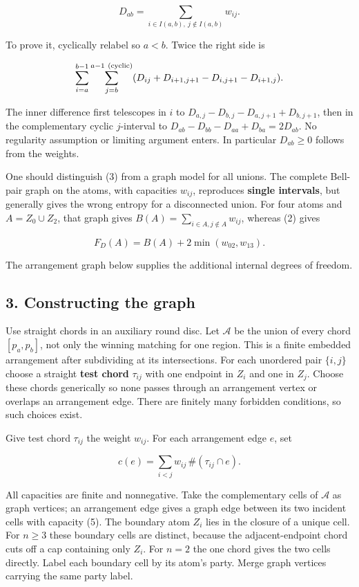 \documentclass[11pt]{article}
\begin{document}
\[
\boxed{D_{ab}=
\sum_{i\in I(a,b),\ j\notin I(a,b)} w_{ij}.}                 \tag{3}
\]

To prove it, cyclically relabel so \(a<b\). Twice the right side is

\[
\sum_{i=a}^{b-1}\sum_{j=b}^{a-1\ ({\rm cyclic})}
 (D_{ij}+D_{i+1,j+1}-D_{i,j+1}-D_{i+1,j}).
\]

The inner difference first telescopes in \(i\) to
\(D_{a,j}-D_{b,j}-D_{a,j+1}+D_{b,j+1}\), then in the complementary
cyclic \(j\)-interval to \(D_{ab}-D_{bb}-D_{aa}+D_{ba}=2D_{ab}\). No
regularity assumption or limiting argument enters. In particular
\(D_{ab}\geq0\) follows from the weights.

One should distinguish (3) from a graph model for all unions. The
complete Bell-pair graph on the atoms, with capacities \(w_{ij}\),
reproduces \textbf{single intervals}, but generally gives the wrong
entropy for a disconnected union. For four atoms and \(A=Z_0\cup Z_2\),
that graph gives \(B(A)=\sum_{i\in A,j\notin A}w_{ij}\), whereas (2)
gives

\[
F_D(A)=B(A)+2\min(w_{02},w_{13}).                             \tag{4}
\]

The arrangement graph below supplies the additional internal degrees of
freedom.

\subsection{3. Constructing the graph}\label{constructing-the-graph}

Use straight chords in an auxiliary round disc. Let \(\mathcal A\) be
the union of every chord \([p_a,p_b]\), not only the winning matching
for one region. This is a finite embedded arrangement after subdividing
at its intersections. For each unordered pair \(\{i,j\}\) choose a
straight \textbf{test chord} \(\tau_{ij}\) with one endpoint in \(Z_i\)
and one in \(Z_j\). Choose these chords generically so none passes
through an arrangement vertex or overlaps an arrangement edge. There are
finitely many forbidden conditions, so such choices exist.

Give test chord \(\tau_{ij}\) the weight \(w_{ij}\). For each
arrangement edge \(e\), set

\[
c(e)=\sum_{i<j}w_{ij}\,\#(\tau_{ij}\cap e).                 \tag{5}
\]

All capacities are finite and nonnegative. Take the complementary cells
of \(\mathcal A\) as graph vertices; an arrangement edge gives a graph
edge between its two incident cells with capacity (5). The boundary atom
\(Z_i\) lies in the closure of a unique cell. For \(n\geq3\) these
boundary cells are distinct, because the adjacent-endpoint chord cuts
off a cap containing only \(Z_i\). For \(n=2\) the one chord gives the
two cells directly. Label each boundary cell by its atom's party. Merge
graph vertices carrying the same party label.
\end{document}

